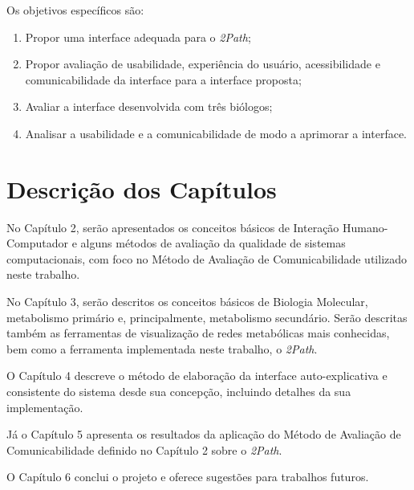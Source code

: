 \indent Os objetivos específicos são:
\begin{enumerate}
\item Propor uma interface adequada para o \textit{2Path};
\item Propor avaliação de usabilidade, experiência do usuário, acessibilidade e comunicabilidade da interface para a interface proposta;
\item Avaliar a interface desenvolvida com três biólogos;
\item Analisar a usabilidade e a comunicabilidade de modo a aprimorar a interface.
\end{enumerate}

\section{Descrição dos Capítulos}
\indent No Capítulo 2, serão apresentados os conceitos básicos de Interação Humano-Computador e alguns métodos de avaliação da qualidade de sistemas computacionais, com foco no Método de Avaliação de Comunicabilidade utilizado neste trabalho.

\indent No Capítulo 3, serão descritos os conceitos básicos de Biologia Molecular, metabolismo primário e, principalmente, metabolismo secundário. Serão descritas também as ferramentas de visualização de redes metabólicas mais conhecidas, bem como a ferramenta implementada neste trabalho, o \textit{2Path}.

\indent O Capítulo 4 descreve o método de elaboração da interface auto-explicativa e consistente do sistema desde sua concepção, incluindo detalhes da sua implementação.

\indent Já o Capítulo 5 apresenta os resultados da aplicação do Método de Avaliação de Comunicabilidade definido no Capítulo 2 sobre o \textit{2Path}.

\indent O Capítulo 6  conclui o projeto e oferece sugestões para trabalhos futuros.